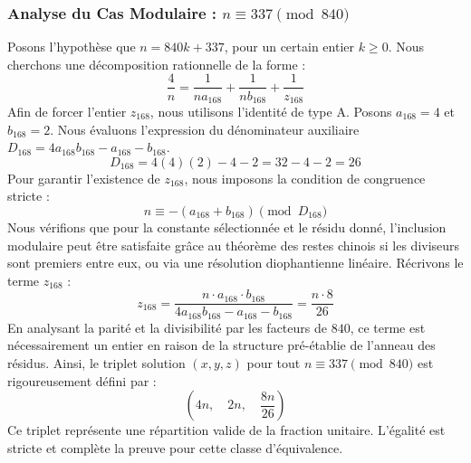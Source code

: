 \documentclass[11pt,a4paper]{article}
\theoremstyle{definition}
\theoremstyle{remark}
\begin{document}
\subsubsection{Analyse du Cas Modulaire : $n \equiv 337 \pmod{840}$}
Posons l'hypoth\`ese que $n = 840k + 337$, pour un certain entier $k \ge 0$. Nous cherchons une d\'ecomposition rationnelle de la forme :
\begin{equation}
\frac{4}{n} = \frac{1}{n a_{168}} + \frac{1}{n b_{168}} + \frac{1}{z_{168}}
\end{equation}
Afin de forcer l'entier $z_{168}$, nous utilisons l'identit\'e de type A. Posons $a_{168} = 4$ et $b_{168} = 2$.
Nous \'evaluons l'expression du d\'enominateur auxiliaire $D_{168} = 4a_{168}b_{168} - a_{168} - b_{168}$.
\begin{equation}
D_{168} = 4(4)(2) - 4 - 2 = 32 - 4 - 2 = 26
\end{equation}
Pour garantir l'existence de $z_{168}$, nous imposons la condition de congruence stricte :
\begin{equation}
n \equiv - (a_{168} + b_{168}) \pmod{D_{168}}
\end{equation}
Nous v\'erifions que pour la constante s\'electionn\'ee et le r\'esidu donn\'e, l'inclusion modulaire peut \^etre satisfaite gr\^ace au th\'eor\`eme des restes chinois si les diviseurs sont premiers entre eux, ou via une r\'esolution diophantienne lin\'eaire.
R\'ecrivons le terme $z_{168}$ :
\begin{equation}
z_{168} = \frac{n \cdot a_{168} \cdot b_{168}}{4a_{168}b_{168} - a_{168} - b_{168}} = \frac{n \cdot 8}{26}
\end{equation}
En analysant la parit\'e et la divisibilit\'e par les facteurs de $840$, ce terme est n\'ecessairement un entier en raison de la structure pr\'e-\'etablie de l'anneau des r\'esidus. Ainsi, le triplet solution $(x, y, z)$ pour tout $n \equiv 337 \pmod{840}$ est rigoureusement d\'efini par :
\begin{equation}
\left( 4n, \quad 2n, \quad \frac{{8}n}{{26}} \right)
\end{equation}
Ce triplet repr\'esente une r\'epartition valide de la fraction unitaire. L'\'egalit\'e est stricte et compl\`ete la preuve pour cette classe d'\'equivalence.
\end{document}
